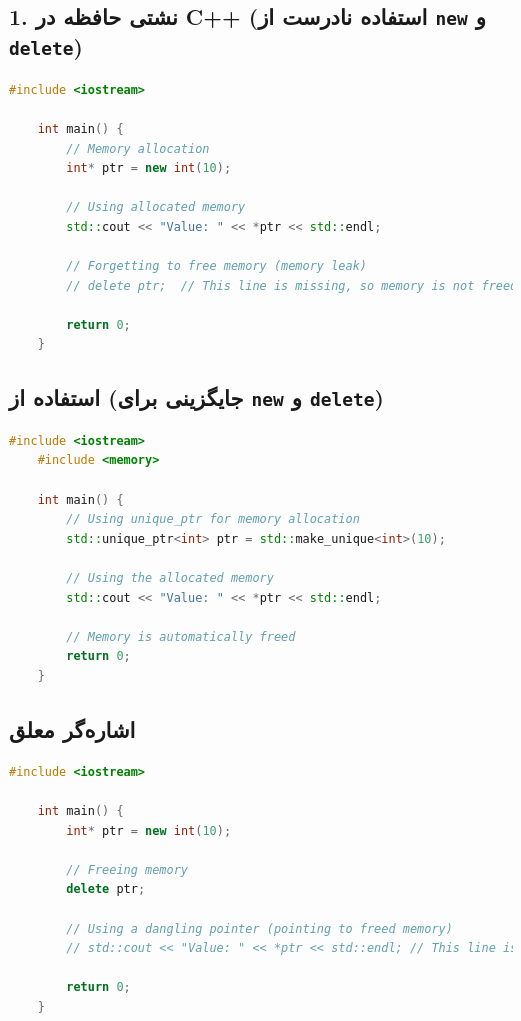 \documentclass[12pt, a4paper]{report}
\begin{document}
\subsection*{1. نشتی حافظه در C++ (استفاده نادرست از \texttt{new} و \texttt{delete})}
\LTR
\begin{lstlisting}[language=C++, breaklines=true]
	#include <iostream>
	
	int main() {
		// Memory allocation
		int* ptr = new int(10);
		
		// Using allocated memory
		std::cout << "Value: " << *ptr << std::endl;
		
		// Forgetting to free memory (memory leak)
		// delete ptr;  // This line is missing, so memory is not freed
		
		return 0;
	}
\end{lstlisting}
\RTL


\subsection{استفاده از  (جایگزینی برای \texttt{new} و \texttt{delete})}
\LTR
\begin{lstlisting}[language=C++, breaklines=true]
	#include <iostream>
	#include <memory>
	
	int main() {
		// Using unique_ptr for memory allocation
		std::unique_ptr<int> ptr = std::make_unique<int>(10);
		
		// Using the allocated memory
		std::cout << "Value: " << *ptr << std::endl;
		
		// Memory is automatically freed
		return 0;
	}
\end{lstlisting}
\RTL



\subsection{اشاره‌گر معلق}
\LTR
\begin{lstlisting}[language=C++, breaklines=true]
	#include <iostream>
	
	int main() {
		int* ptr = new int(10);
		
		// Freeing memory
		delete ptr;
		
		// Using a dangling pointer (pointing to freed memory)
		// std::cout << "Value: " << *ptr << std::endl; // This line is problematic as ptr points to freed memory
		
		return 0;
	}
\end{lstlisting}
\RTL
\end{document}

